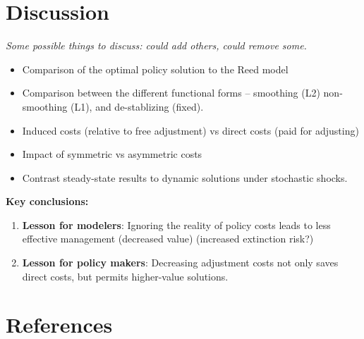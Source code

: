 \documentclass[authoryear, review, 12pt]{elsarticle}
\newcommand{\cdb}[1]{{\it \color{darkgreen} #1}}
\begin{document}
\section{Discussion}
\cdb{Some possible things to discuss: could add others, could remove some.}
\begin{itemize}
\item   Comparison of the optimal policy solution to the Reed model
\item  Comparison between the different functional forms -- smoothing (L2)
  non-smoothing (L1), and de-stablizing (fixed).
\item   Induced costs (relative to free adjustment) vs direct costs (paid for adjusting) 
\item   Impact of symmetric vs asymmetric costs
\item   Contrast steady-state results to dynamic solutions under stochastic shocks.
\end{itemize}

\textbf{Key conclusions:}
\begin{enumerate}
  \item \textbf{Lesson for modelers}: Ignoring the reality of policy costs leads to less effective management (decreased value)  (increased extinction risk?)
  \item \textbf{Lesson for policy makers}: Decreasing adjustment costs not only saves direct costs, but permits higher-value solutions.
\end{enumerate}


\section*{References}

\end{document}
